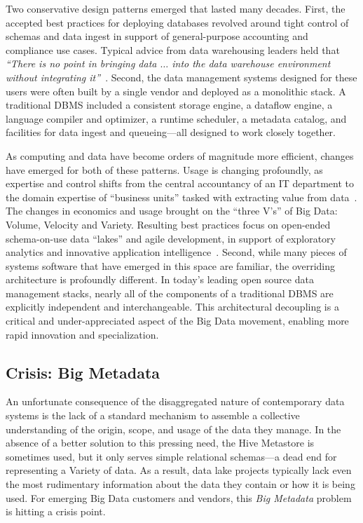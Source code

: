 \documentclass{sig-alternate}
\begin{document}
Two conservative design patterns emerged that lasted many decades. First, the accepted best practices
for deploying databases revolved around tight control of schemas and data ingest in support of 
general-purpose accounting and compliance use cases. 
Typical advice from data
warehousing leaders held that 
\emph{``There is no point in 
bringing data $\ldots$ into the data warehouse environment without integrating it''}~\cite{inmon2005building}. 
Second, 
the data management systems designed for these users were often built by a single vendor and deployed as a
monolithic stack. 
A traditional DBMS included a consistent storage engine, a dataflow engine, 
a language compiler and optimizer, a runtime scheduler, a metadata catalog, and facilities for data ingest 
and queueing---all designed to work closely together.


As computing and data have become orders of magnitude more efficient, changes have emerged for both of these patterns. 
Usage is changing profoundly, as expertise and control shifts from the central accountancy of an IT department to 
the domain expertise of ``business units'' tasked with extracting value from data~\cite{gartner}. 
The changes in economics and usage brought on the ``three V's'' of Big Data: Volume, Velocity and Variety.
Resulting best practices focus on open-ended schema-on-use
data ``lakes'' and agile development, in support of exploratory analytics and innovative application intelligence~\cite{patil2012data}. 
Second, while many pieces of systems software that have emerged in this space are familiar, the overriding architecture is profoundly 
different. In today's leading open source
data management stacks, nearly all of the components 
of a traditional DBMS are explicitly independent 
and interchangeable.  This architectural decoupling is 
a critical and under-appreciated aspect of the Big Data movement,
enabling more rapid innovation and specialization.

\subsection{Crisis: Big Metadata}

An unfortunate consequence of the disaggregated nature of contemporary data systems
is the lack of a standard mechanism
to assemble a collective understanding of the origin, scope, and usage of the data they manage.
In the absence of a better solution to this pressing need, the 
Hive Metastore is sometimes used, but it only serves simple relational schemas---a dead end for representing a Variety of data. 
As a result, data lake projects typically lack 
even the most rudimentary information about the data they contain or how it is being used. 
For emerging Big Data customers and vendors, this \emph{Big Metadata} problem is hitting a crisis point.  
\end{document}
